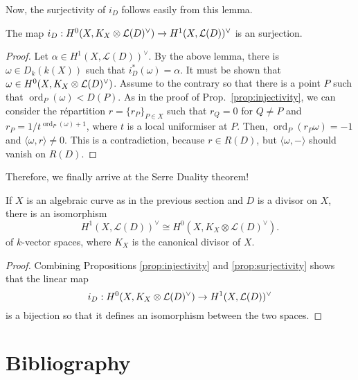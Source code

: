 \documentclass[12pt]{article}
\DeclareMathOperator{\ord}{ord}
\begin{document}
Now, the surjectivity of $i_{D}$ follows easily from this lemma.
\begin{prop}\label{prop:surjectivity}
  The map $i_{D}:H^0(X,K_X\otimes\mathcal{L}(D)^{\vee})\to H^{1}(X,\mathcal{L}(D))^{\vee}$ is an surjection.
\end{prop}
\begin{proof}
  Let $\alpha\in H^{1}(X,\mathcal{L}(D))^{\vee}$. By the above lemma,
  there is $\omega\in D_{k}(k(X))$ such that $i_{D}^{\ast}(\omega)=\alpha$.
  It must be shown that $\omega\in H^0(X,K_X\otimes\mathcal{L}(D)^{\vee})$. Assume to the contrary so that
  there is a point $P$ such that $\ord_{P}(\omega)<D(P)$. As in the proof
  of Prop.~\ref{prop:injectivity}, we can consider the r\'epartition
  $r=\{r_{P}\}_{P\in X}$ such that $r_{Q}=0$ for $Q\neq P$ and $r_{P}
  =1/t^{\ord_{P}(\omega)+1}$, where $t$ is a local uniformiser at $P$.
  Then, $\ord_{P}(r_{P}\omega)=-1$ and $\langle\omega,r\rangle\neq 0$.
  This is a contradiction, because $r\in R(D)$, but $\langle\omega,-\rangle$
  should vanish on $R(D)$.
\end{proof}

Therefore, we finally arrive at the Serre Duality theorem!
\begin{thm}
  If $X$ is an algebraic curve as in the previous section
  and $D$ is a divisor on $X$, there is an isomorphism
  \[
    H^{1}(X, \mathcal{L}(D))^{\vee}\cong H^{0}(X, K_{X}
    \otimes \mathcal{L}(D)^{\vee}).
  \]
  of $k$-vector spaces, where $K_{X}$ is the canonical divisor of $X$.
\end{thm}
\begin{proof}
  Combining Propositions \ref{prop:injectivity} and \ref{prop:surjectivity}
  shows that the linear map
  \[i_{D}:H^0(X,K_X\otimes\mathcal{L}(D)^{\vee})\to H^{1}(X,\mathcal{L}(D))^{\vee}\]
  is a bijection so that it defines an isomorphism between the two spaces.
\end{proof}

\section{Bibliography}


\end{document}
